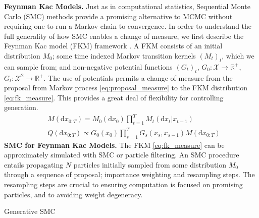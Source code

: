 \textbf{Feynman Kac Models.}
Just as in computational statistics, Sequential Monte Carlo (SMC) methods provide a promising alternative to MCMC without requiring one to run a Markov chain to convergence. In order to understand the full generality of how SMC enables a change of measure, we first describe the Feynman Kac model (FKM) framework \citep{chopin2020introduction}. A FKM consists of an initial distribution $M_0$; some time indexed Markov transition kernels $(M_t)_t$, which we can sample from; and non-negative potential functions $(G_t)_t$, $G_0: \mathcal{X} \rightarrow \mathbb{R}^+$, $G_t: \mathcal{X}^2 \rightarrow \mathbb{R}^+$. 
The use of potentials permits a change of measure from the proposal from Markov process \eqref{eq:proposal_measure} to the FKM distribution \eqref{eq:fk_measure}. This provides a great deal of flexibility for controlling generation.
\begin{align}
    &M(\mathrm{d}x_{0:T}) = M_0(\mathrm{d}x_0)\prod_{t=1}^{T}M_t(\mathrm{d}x_t|x_{t-1}) \label{eq:proposal_measure} \\ 
    &Q(\mathrm{d}x_{0:T}) \propto G_0(x_0)\prod_{s=1}^{T}G_s(x_s,x_{s-1})M(\mathrm{d}x_{0:T}) \label{eq:fk_measure} 
\end{align}
\textbf{SMC for Feynman Kac Models.}
The FKM \eqref{eq:fk_measure} can be approximately simulated with SMC or particle filtering. An SMC procedure entails propagating $N$ particles initially sampled from some distribution $M_0$ through a sequence of proposal; importance weighting and resampling steps. The resampling steps are crucial to ensuring computation is focused on promising particles, and to avoiding weight degeneracy.
 
\begin{algorithm}
        \caption{Generative SMC}
        \label{alg:pf}
        \setlength{\parindent}{0pt}
        \begin{algorithmic}
        \EndFor
        \end{algorithmic}
        \end{algorithm}

